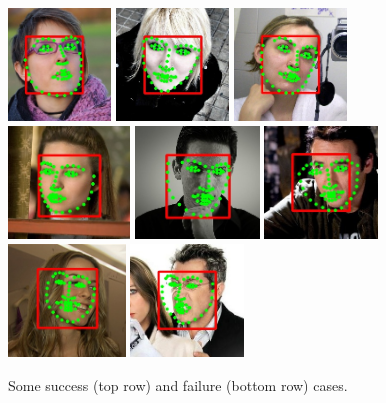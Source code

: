 \documentclass{article}
\begin{document}
		\begin{figure}
			\center
			\resizebox{0.5\textwidth}{!}
			{
				\includegraphics[height=3cm]{succ1.jpg}
				\includegraphics[height=3cm]{succ2.jpg}
				\includegraphics[height=3cm]{succ3.jpg}
				\includegraphics[height=3cm]{succ4.jpg}
			}
			\resizebox{0.5\textwidth}{!}
			{
				\includegraphics[height=3cm]{fail1.jpg}
				\includegraphics[height=3cm]{fail2.jpg}
				\includegraphics[height=3cm]{fail3.jpg}
				\includegraphics[height=3cm]{fail4.jpg}
			}
			\caption
			{
				\small Some success (top row) and failure (bottom row) cases.
			}
			\label{fig:succfail}
		\end{figure}
\end{document}
